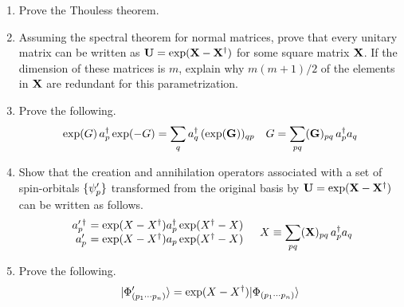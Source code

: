 \documentclass[11pt]{article}
\begin{document}
\begin{enumerate}
\item
Prove the Thouless theorem.

\item
Assuming the spectral theorem for normal matrices, prove that every unitary matrix can be written as
$
  \mathbf{U}
=
  \mathrm{exp}(\mathbf{X} - \mathbf{X}^\dagger)
$
for some square matrix $\mathbf{X}$.
If the dimension of these matrices is $m$, explain why $m(m+1)/2$ of the elements in $\mathbf{X}$ are redundant for this parametrization.

\item
Prove the following.
\begin{align}
  \mathrm{exp}(G)\,a_p^\dagger\,\mathrm{exp}(-G)
=
  \sum_q
  a_q^\dagger\,
  (\mathrm{exp}(\mathbf{G}))_{qp}
&&
  G
=
  \sum_{pq}
  (\mathbf{G})_{pq}\,
  a_p^\dagger a_q
\end{align}



\item
Show that the creation and annihilation operators associated with a set of spin-orbitals $\{\psi _p'\}$ transformed from the original basis by $\mathbf{U}=\mathrm{exp}(\mathbf{X} - \mathbf{X}^\dagger)$ can be written as follows.
\begin{align}
\begin{array}{r@{\ }l}
  a_p^{\prime\,\dagger}
&=
  \mr{exp}(X - X\dg)
  a_p\dg\,
  \mr{exp}(X\dg - X)
\\
  a_p^{\prime}
&=
  \mr{exp}(X - X\dg)
  a_p\,
  \mr{exp}(X\dg - X)
\end{array}
&&
  X
\equiv
  \sum_{pq}
  (\bo{X})_{pq}\,
  a_p\dg a_q
\end{align}


\item
Prove the following.
\begin{align}
  |\Phi '_{(p_1\cdots p_n)}\rangle
=
  \mathrm{exp}(X - X^\dagger)
  |\Phi _{(p_1\cdots p_n)}\rangle
\end{align}




\end{enumerate}
\end{document}
